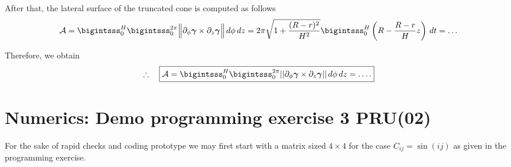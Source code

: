 \documentclass[12pt]{article}
\begin{document}
After that, the lateral surface of the truncated cone 
is computed as follows
\begin{align*}
	\mathcal{A}
	=
	\bigintsss_{0}^H \bigintsss_0^{2 \pi}
	\Big\| 
	\partial_{\phi} \bm{\gamma} \times \partial_z \bm{\gamma}
	\Big\|
	\, d\phi \, dz                            
	= 2 \pi \sqrt{1 + \frac{(R-r)^2}{H^2}}
	\bigintsss_{0}^H \left(R - \frac{R-r}{H}z\right) \, dt 
	= \dots
\end{align*}

Therefore, we obtain
\begin{align*}
	\therefore\quad\boxed{
		\mathcal{A} =
		\bigintsss_{0}^H \bigintsss_0^{2 \pi}
		||\partial_{\phi} \bm{\gamma} \times \partial_z \bm{\gamma} || \, d\phi \, dz
		= \dots.
	}
\end{align*}
\clearpage
\section{Numerics: Demo programming exercise 3 PRU(02)}
\begin{observationboxed}
	For the sake of rapid checks and coding prototype
	we may first start with a matrix sized $4\times 4$
	for the case $C_{ij}=\sin(ij)$ as given in the programming exercise.
\end{observationboxed}


% 
\end{document}
